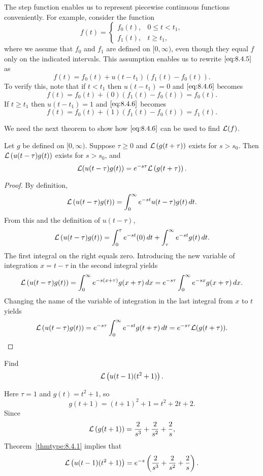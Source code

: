 \documentclass{ximera}
\begin{document}
The step function enables us to represent piecewise continuous
functions conveniently. For example, consider the function
\begin{equation}\label{eq:8.4.5}
f(t)=\left\{\begin{array}{rl}
f_0(t),&0\leq t<t_1,\\
f_1(t),&t\geq t_1,
\end{array}\right.
\end{equation}
where we assume that $f_0$ and $f_1$ are defined on $[0,\infty)$, even
though they equal $f$ only on the indicated intervals. This assumption
enables us to rewrite $\eqref{eq:8.4.5}$ as
\begin{equation}\label{eq:8.4.6}
f(t)=f_0(t)+u(t-t_1)\left(f_1(t)-f_0(t)\right).
\end{equation}
To verify this, note that if $t<t_1$ then $u(t-t_1)=0$ and
$\eqref{eq:8.4.6}$  becomes
$$
f(t)=f_0(t)+(0)\left(f_1(t)-f_0(t)\right)=f_0(t).
$$
If $t\geq t_1$ then $u(t-t_1)=1$ and $\eqref{eq:8.4.6}$ becomes
$$
f(t)=f_0(t)+(1)\left(f_1(t)-f_0(t)\right)=f_1(t).
$$

We need the next theorem to
show how $\eqref{eq:8.4.6}$ can be used to find ${\cal L}(f)$.

\begin{theorem}\label{thmtype:8.4.1}
Let $g$ be defined on $[0,\infty).$ Suppose   $\tau\geq 0$ and ${\cal
L}\left(g(t+\tau)\right)$ exists for $s>s_0.$ Then ${\cal
L}\left(u(t-\tau)g(t)\right)$ exists for $s>s_0$, and
$$
{\cal L}(u(t-\tau)g(t))=e^{-s\tau}{\cal L}\left(g(t+\tau)\right).
$$
\end{theorem}

\begin{proof}
By definition,
$$
{\cal L}\left(u(t-\tau)g(t)\right)=\int_0^\infty e^{-st} u(t-\tau)g(t)\,
dt.
$$
From this and the definition of $u(t-\tau)$,
$$
{\cal L}\left(u(t-\tau)g(t)\right)=\int_0^\tau
e^{-st}(0)\,dt+\int_{\tau}^\infty e^{-st}g(t)\,dt.
$$
The first integral on the right equals zero.  Introducing the new variable
of integration $x=t-\tau$ in the second integral yields
$$
{\cal L}\left(u(t-\tau)g(t)\right)=\int_0^\infty e^{-s(x+\tau)}g(x+\tau)\,dx
=e^{-s\tau}\int_0^\infty e^{-sx} g(x+\tau)\,dx.
$$
Changing the name of the variable of integration in the last integral
from $x$ to $t$ yields
$$
{\cal L}\left(u(t-\tau)g(t)\right)
=e^{-s\tau}\int_0^\infty e^{-st} g(t+\tau)\,dt=e^{-s\tau}{\cal
L}(g(t+\tau)).
$$
\end{proof}

\begin{example}\label{example:8.4.2}
 Find
$$
{\cal L}\left(u(t-1)(t^2+1)\right).
$$
\begin{explanation}
Here $\tau=1$ and $g(t)=t^2+1$, so
$$
g(t+1)=(t+1)^2+1=t^2+2t+2.
$$
Since
$$
{\cal L}\left(g(t+1)\right)=\frac{2}{s^3}+\frac{2}{s^2}+\frac{2}{s},
$$
Theorem~\ref{thmtype:8.4.1} implies that
$${\cal L}\left(u(t-1)(t^2+1)\right)
=e^{-s}\left(\frac{2}{s^3}+\frac{2}{s^2}+\frac{2}{s}\right).
$$
\end{explanation}
\end{example}
\end{document}
